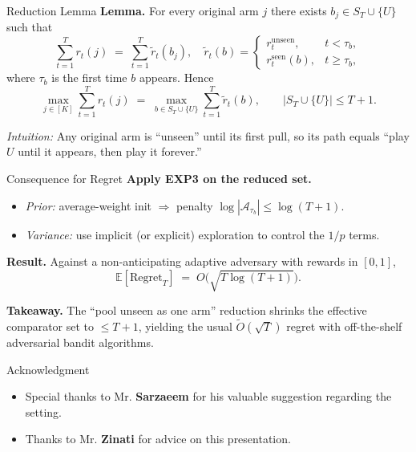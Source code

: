 \documentclass{beamer}
\begin{document}
\begin{frame}{Reduction Lemma}
  \small
  \textbf{Lemma.}
  For every original arm \(j\) there exists \(b_j\in S_T\cup\{U\}\) such that
  \[
    \sum_{t=1}^T r_t(j)\;=\;\sum_{t=1}^T \tilde r_t(b_j),
    \quad
    \tilde r_t(b)=
    \begin{cases}
      r_t^{\text{unseen}},  & t<\tau_b,    \\
      r_t^{\text{seen}}(b), & t\ge \tau_b,
    \end{cases}
  \]
  where \(\tau_b\) is the first time \(b\) appears.
  Hence
  \[
    \max_{j\in[K]}\sum_{t=1}^T r_t(j)
    \;=\;
    \max_{b\in S_T\cup\{U\}} \sum_{t=1}^T \tilde r_t(b),
    \qquad |S_T\cup\{U\}|\le T{+}1.
  \]

  \textit{Intuition:} Any original arm is “unseen” until its first pull, so its path equals “play \(U\) until it appears, then play it forever.”
\end{frame}

\begin{frame}{Consequence for Regret}
  \small
  \textbf{Apply EXP3 on the reduced set.}

  \begin{itemize}
    \item \emph{Prior:} average-weight init \(\Rightarrow\) penalty \(\log|\mathcal A_{\tau_b}|\le \log(T{+}1)\).
    \item \emph{Variance:} use implicit (or explicit) exploration to control the \(1/p\) terms.
  \end{itemize}

  \medskip
  \textbf{Result.} Against a non-anticipating adaptive adversary with rewards in \([0,1]\),
  \[
    \mathbb{E}[\mathrm{Regret}_T]\;=\;O \big(\sqrt{T\log(T{+}1)}\big).
  \]


  \medskip
  \textbf{Takeaway.} The “pool unseen as one arm” reduction shrinks the effective comparator set to \(\le T{+}1\), yielding the usual \(\tilde O(\sqrt{T})\) regret with off-the-shelf adversarial bandit algorithms.
\end{frame}



\begin{frame}{Acknowledgment}
  \begin{itemize}
    \item Special thanks to Mr. \textbf{Sarzaeem} for his valuable suggestion regarding the setting.
    \item Thanks to Mr. \textbf{Zinati} for advice on this presentation.
  \end{itemize}
\end{frame}
\end{document}
